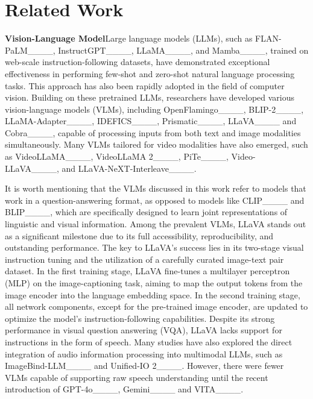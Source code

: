 \section{Related Work}
\textbf{Vision-Language Model}\quad Large language models (LLMs), such as FLAN-PaLM____, InstructGPT____, LLaMA____, and Mamba____, trained on web-scale instruction-following datasets, have demonstrated exceptional effectiveness in performing few-shot and zero-shot natural language processing tasks. This approach has also been rapidly adopted in the field of computer vision. Building on these pretrained LLMs, researchers have developed various vision-language models (VLMs), including OpenFlamingo____, BLIP-2____, LLaMA-Adapter____, IDEFICS____, Prismatic____, LLaVA____ and Cobra____, capable of processing inputs from both text and image modalities simultaneously. Many VLMs tailored for video modalities have also emerged, such as VideoLLaMA____, VideoLLaMA 2____, PiTe____, Video-LLaVA____, and LLaVA-NeXT-Interleave____.

It is worth mentioning that the VLMs discussed in this work refer to models that work in a question-answering format, as opposed to models like CLIP____ and BLIP____, which are specifically designed to learn joint representations of linguistic and visual information. Among the prevalent VLMs, LLaVA stands out as a significant milestone due to its full accessibility, reproducibility, and outstanding performance. The key to LLaVA's success lies in its two-stage visual instruction tuning and the utilization of a carefully curated image-text pair dataset. In the first training stage, LLaVA fine-tunes a multilayer perceptron (MLP) on the image-captioning task, aiming to map the output tokens from the image encoder into the language embedding space. In the second training stage, all network components, except for the pre-trained image encoder, are updated to optimize the model's instruction-following capabilities. Despite its strong performance in visual question answering (VQA), LLaVA lacks support for instructions in the form of speech. Many studies have also explored the direct integration of audio information processing into multimodal LLMs, such as ImageBind-LLM____ and Unified-IO 2____. However, there were fewer VLMs capable of supporting raw speech understanding until the recent introduction of GPT-4o____, Gemini____ and VITA____.

